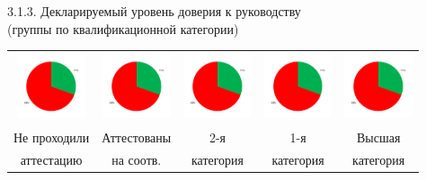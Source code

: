 \begin{frame}{3.1.3. Декларируемый уровень доверия к руководству \\ (группы по квалификационной категории) }
\begin{tabular}{ccccc}
\includegraphics[width=2cm, height=2cm]{diag.png} & 
\includegraphics[width=2cm, height=2cm]{diag.png} & 
\includegraphics[width=2cm, height=2cm]{diag.png} & 
\includegraphics[width=2cm, height=2cm]{diag.png} & 
\includegraphics[width=2cm, height=2cm]{diag.png} \\
 Не проходили &  Аттестованы & 2-я &  1-я  & Высшая \\ 
  аттестацию   &  на соотв. & категория &  категория  & категория \\ 
\end{tabular}

\end{frame}


